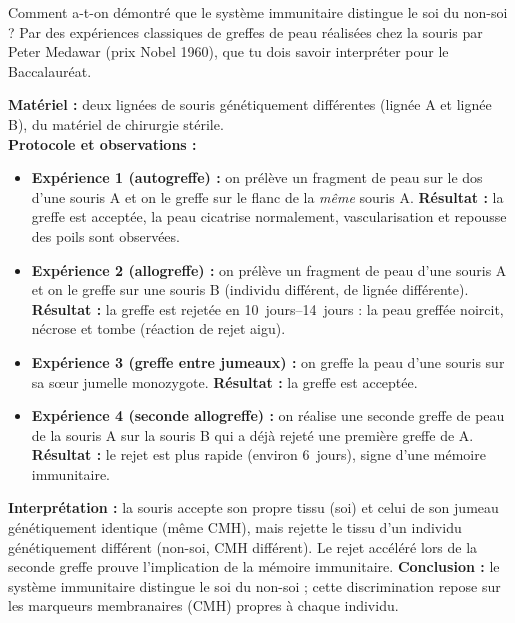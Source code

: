 \documentclass[11pt]{article}
\newcommand{\cle}[1]{{\popxbold\color{popdark}#1}}
\begin{document}
Comment a-t-on démontré que le système immunitaire distingue le soi du non-soi ? Par des expériences classiques de greffes de peau réalisées chez la souris par Peter Medawar (prix Nobel 1960), que tu dois savoir interpréter pour le Baccalauréat.

\begin{experience}
\textbf{Matériel :} deux lignées de souris génétiquement différentes (lignée A et lignée B), du matériel de chirurgie stérile.\\
\textbf{Protocole et observations :}
\begin{itemize}
\item \textbf{Expérience 1 (autogreffe) :} on prélève un fragment de peau sur le dos d'une souris A et on le greffe sur le flanc de la \emph{même} souris A. \textbf{Résultat :} la greffe est acceptée, la peau cicatrise normalement, vascularisation et repousse des poils sont observées.
\item \textbf{Expérience 2 (allogreffe) :} on prélève un fragment de peau d'une souris A et on le greffe sur une souris B (individu différent, de lignée différente). \textbf{Résultat :} la greffe est rejetée en \SIrange{10}{14}{jours} : la peau greffée noircit, nécrose et tombe (réaction de rejet aigu).
\item \textbf{Expérience 3 (greffe entre jumeaux) :} on greffe la peau d'une souris sur sa sœur jumelle monozygote. \textbf{Résultat :} la greffe est acceptée.
\item \textbf{Expérience 4 (seconde allogreffe) :} on réalise une seconde greffe de peau de la souris A sur la souris B qui a déjà rejeté une première greffe de A. \textbf{Résultat :} le rejet est plus rapide (environ \SI{6}{jours}), signe d'une mémoire immunitaire.
\end{itemize}
\textbf{Interprétation :} la souris accepte son propre tissu (soi) et celui de son jumeau génétiquement identique (même CMH), mais rejette le tissu d'un individu génétiquement différent (non-soi, CMH différent). Le rejet accéléré lors de la seconde greffe prouve l'implication de la mémoire immunitaire.
\textbf{Conclusion :} le système immunitaire distingue le \cle{soi} du \cle{non-soi} ; cette discrimination repose sur les marqueurs membranaires (CMH) propres à chaque individu.
\end{experience}
\end{document}
